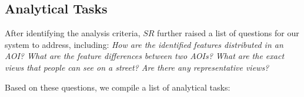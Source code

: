 \subsection{Analytical Tasks}
\label{ssec:tasks}

After identifying the analysis criteria, $SR$ further raised a list of questions for our system to address, including:
\textit{How are the identified features distributed in an AOI?
What are the feature differences between two AOIs?
What are the exact views that people can see on a street?
Are there any representative views?}

Based on these questions, we compile a list of analytical tasks:

\vspace*{-2mm}
